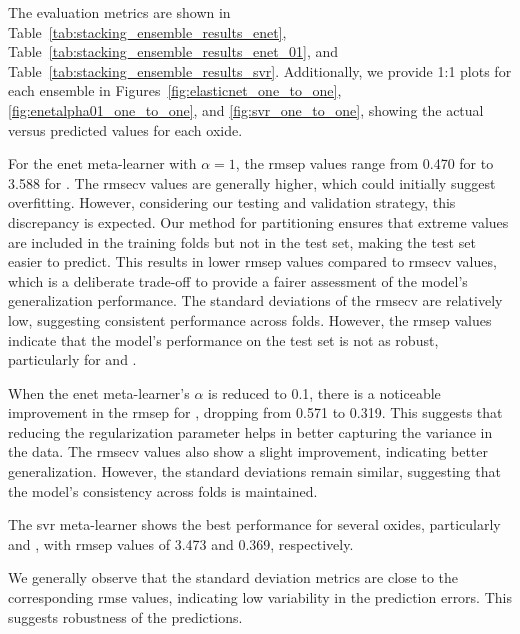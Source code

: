 The evaluation metrics are shown in Table~\ref{tab:stacking_ensemble_results_enet}, Table~\ref{tab:stacking_ensemble_results_enet_01}, and Table~\ref{tab:stacking_ensemble_results_svr}.
Additionally, we provide 1:1 plots for each ensemble in Figures~\ref{fig:elasticnet_one_to_one}, \ref{fig:enetalpha01_one_to_one}, and \ref{fig:svr_one_to_one}, showing the actual versus predicted values for each oxide.

For the \gls{enet} meta-learner with $\alpha = 1$, the \gls{rmsep} values range from 0.470 for  to 3.588 for .
The \gls{rmsecv} values are generally higher, which could initially suggest overfitting.
However, considering our testing and validation strategy, this discrepancy is expected.
Our method for partitioning ensures that extreme values are included in the training folds but not in the test set, making the test set easier to predict.
This results in lower \gls{rmsep} values compared to \gls{rmsecv} values, which is a deliberate trade-off to provide a fairer assessment of the model's generalization performance.
The standard deviations of the \gls{rmsecv} are relatively low, suggesting consistent performance across folds.
However, the \gls{rmsep} values indicate that the model's performance on the test set is not as robust, particularly for  and .

When the \gls{enet} meta-learner's $\alpha$ is reduced to 0.1, there is a noticeable improvement in the \gls{rmsep} for , dropping from 0.571 to 0.319.
This suggests that reducing the regularization parameter helps in better capturing the variance in the data.
The \gls{rmsecv} values also show a slight improvement, indicating better generalization.
However, the standard deviations remain similar, suggesting that the model's consistency across folds is maintained.

The \gls{svr} meta-learner shows the best performance for several oxides, particularly  and , with \gls{rmsep} values of 3.473 and 0.369, respectively.

We generally observe that the standard deviation metrics are close to the corresponding \gls{rmse} values, indicating low variability in the prediction errors.
This suggests robustness of the predictions.

